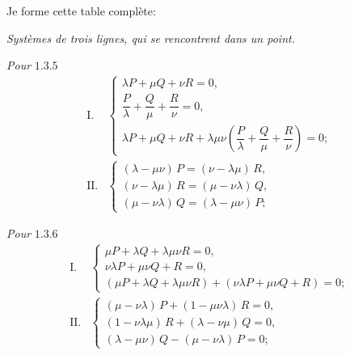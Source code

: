 \documentclass[12pt,a4paper]{article}
\theoremstyle{plain}
\begin{document}
Je forme cette table compl\`ete:

\begin{center}\textit{Syst\`emes de trois lignes, qui se rencontrent dans un point.}\end{center}

\textit{Pour} $1.3.5$
\[
\begin{array}{ll}
\text{I.} & \begin{cases}
\lambda P + \mu Q + \nu R = 0, \\[2pt]
\dfrac{P}{\lambda} + \dfrac{Q}{\mu} + \dfrac{R}{\nu} = 0, \\[6pt]
\lambda P + \mu Q + \nu R + \lambda\mu\nu \left(\dfrac{P}{\lambda} + \dfrac{Q}{\mu} + \dfrac{R}{\nu}\right) = 0;
\end{cases} \\[18pt]
\text{II.} & \begin{cases}
(\lambda - \mu\nu)\, P = (\nu - \lambda\mu)\, R, \\[2pt]
(\nu - \lambda\mu)\, R = (\mu - \nu\lambda)\, Q, \\[2pt]
(\mu - \nu\lambda)\, Q = (\lambda - \mu\nu)\, P;
\end{cases}
\end{array}
\]

\textit{Pour} $1.3.6$
\[
\begin{array}{ll}
\text{I.} & \begin{cases}
\mu P + \lambda Q + \lambda\mu\nu R = 0, \\[2pt]
\nu\lambda P + \mu\nu Q + R = 0, \\[2pt]
(\mu P + \lambda Q + \lambda\mu\nu R) + (\nu\lambda P + \mu\nu Q + R) = 0;
\end{cases} \\[18pt]
\text{II.} & \begin{cases}
(\mu - \nu\lambda)\, P + (1 - \mu\nu\lambda)\, R = 0, \\[2pt]
(1 - \nu\lambda\mu)\, R + (\lambda - \nu\mu)\, Q = 0, \\[2pt]
(\lambda - \mu\nu)\, Q - (\mu - \nu\lambda)\, P = 0;
\end{cases}
\end{array}
\]
\end{document}
